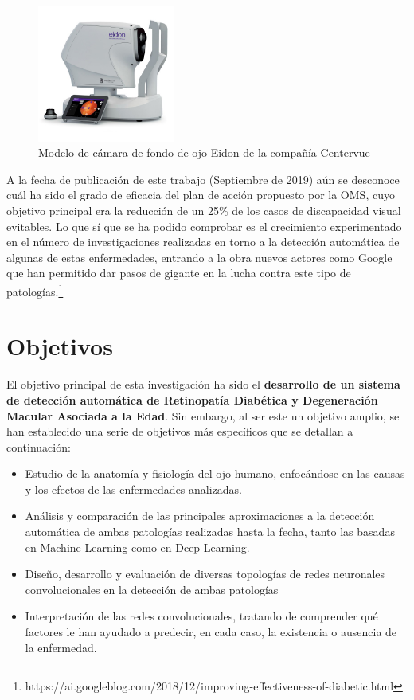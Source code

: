 \documentclass[
  12pt,
  spanish,
  a4paperpaper,
]{report}
\providecommand{\tightlist}{%
  \setlength{\itemsep}{0pt}\setlength{\parskip}{0pt}}
\begin{document}
\begin{figure}
\centering
\includegraphics[width=0.4\textwidth,height=\textheight]{source/figures/eidon.jpg}
\caption{Modelo de cámara de fondo de ojo Eidon de la compañía Centervue
\label{eidon}}
\end{figure}

A la fecha de publicación de este trabajo (Septiembre de 2019) aún se
desconoce cuál ha sido el grado de eficacia del plan de acción propuesto
por la OMS, cuyo objetivo principal era la reducción de un 25\% de los
casos de discapacidad visual evitables. Lo que sí que se ha podido
comprobar es el crecimiento experimentado en el número de
investigaciones realizadas en torno a la detección automática de algunas
de estas enfermedades, entrando a la obra nuevos actores como Google que
han permitido dar pasos de gigante en la lucha contra este tipo de
patologías.\footnote{https://ai.googleblog.com/2018/12/improving-effectiveness-of-diabetic.html}

\hypertarget{objetivos}{%
\section{Objetivos}\label{objetivos}}

El objetivo principal de esta investigación ha sido el
\textbf{desarrollo de un sistema de detección automática de Retinopatía
Diabética y Degeneración Macular Asociada a la Edad}. Sin embargo, al
ser este un objetivo amplio, se han establecido una serie de objetivos
más específicos que se detallan a continuación:

\begin{itemize}
\tightlist
\item
  Estudio de la anatomía y fisiología del ojo humano, enfocándose en las
  causas y los efectos de las enfermedades analizadas.
\item
  Análisis y comparación de las principales aproximaciones a la
  detección automática de ambas patologías realizadas hasta la fecha,
  tanto las basadas en Machine Learning como en Deep Learning.
\item
  Diseño, desarrollo y evaluación de diversas topologías de redes
  neuronales convolucionales en la detección de ambas patologías
\item
  Interpretación de las redes convolucionales, tratando de comprender
  qué factores le han ayudado a predecir, en cada caso, la existencia o
  ausencia de la enfermedad.
\end{itemize}
\end{document}
